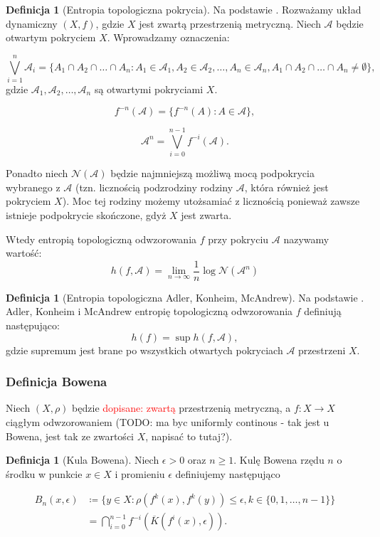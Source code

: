 \documentclass[licencjacka]{pwr_wmat_praca_dyplomowa}
\theoremstyle{plain}
\numberwithin{theorem}{chapter}
\theoremstyle{definition}
\numberwithin{theorem}{chapter}
\newtheorem{definition}[theorem]{Definicja}
\begin{document}
\begin{definition}[Entropia topologiczna pokrycia]
Na podstawie \cite{misiurewicz1993}.
Rozważamy układ dynamiczny $(X, f)$, gdzie $X$ jest zwartą przestrzenią metryczną. Niech $\mathcal{A}$ będzie otwartym pokryciem $X$.
Wprowadzamy oznaczenia:

$$\bigvee_{i=1}^n \mathcal{A}_i = \{A_1 \cap A_2 \cap \ldots \cap A_n : A_1 \in \mathcal{A}_1, A_2 \in \mathcal{A}_2, \ldots, A_n \in \mathcal{A}_n, A_1 \cap A_2 \cap \ldots \cap A_n \neq \emptyset \},$$ 
gdzie $\mathcal{A}_1, \mathcal{A}_2, \ldots, \mathcal{A}_n$ są otwartymi pokryciami $X$.

$$f^{-n}(\mathcal{A}) = \{f^{-n}(A):A\in \mathcal{A}\},$$

$$\mathcal{A}^n = \bigvee_{i=0}^{n-1}f^{-i}(\mathcal{A}).$$

Ponadto niech $\mathcal{N}(\mathcal{A})$ będzie najmniejszą możliwą mocą podpokrycia wybranego z $\mathcal{A}$ (tzn. licznością podzrodziny rodziny $\mathcal{A}$, która również jest pokryciem $X$). Moc tej rodziny możemy utożsamiać z licznością ponieważ zawsze istnieje podpokrycie skończone, gdyż $X$ jest zwarta.

Wtedy entropią topologiczną odwzorowania $f$ przy pokryciu $\mathcal{A}$ nazywamy wartość:
$$h(f, \mathcal{A}) = \lim_{n \rightarrow \infty}{\frac{1}{n}\log\mathcal{N}(\mathcal{A}^n)}$$
\end{definition}

\begin{definition}[Entropia topologiczna Adler, Konheim, McAndrew]
Na podstawie \cite{misiurewicz1993}.
Adler, Konheim i McAndrew entropię topologiczną odwzorowania $f$ definiują następująco: 
$$h(f) = \sup h(f, \mathcal{A}),$$ gdzie supremum jest brane po wszystkich otwartych pokryciach $\mathcal{A}$ przestrzeni $X$.
\end{definition}


\subsubsection{Definicja Bowena}
\cite{ruette2017chaos}

Niech $(X, \rho)$ będzie \textcolor{red}{ dopisane: zwartą} przestrzenią metryczną, a $f: X \rightarrow X$ ciągłym odwzorowaniem (TODO: ma byc uniformly continous - tak jest u Bowena, jest tak ze zwartości $X$, napisać to tutaj?).

\begin{definition}[Kula Bowena]
Niech  $\epsilon > 0$ oraz $n \geq 1$. Kulę Bowena rzędu $n$ o środku w punkcie $x \in X$ i promieniu $\epsilon$ definiujemy następująco

\begin{equation}
\begin{aligned}
B_n(x,\epsilon) & \coloneqq \{y \in X : \rho(f^k(x), f^k(y)) \leq \epsilon, k \in \{0, 1, \ldots, n-1\}\} \\
& = \bigcap_{i=0}^{n-1}f^{-i}(\overline{K}(f^i(x), \epsilon)).
\end{aligned}
\end{equation}

\end{definition} 
\end{document}
